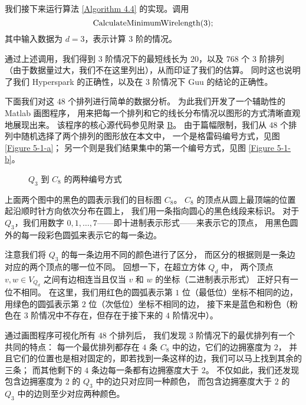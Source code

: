 我们接下来运行算法 \ref{Algorithm 4.4} 的实现。调用
\begin{equation*}
\textnormal{CalculateMinimumWirelength}(3);
\end{equation*}
其中输入数据为 $d = 3$，表示计算 $3$ 阶的情况。

通过上述调用，我们得到 $3$ 阶情况下的最短线长为 $20$，以及 $768$ 个 $3$ 阶排列
（由于数据量过大，我们不在这里列出），从而印证了我们的估算。
同时这也说明了我们 Hyperspark 的正确性，以及在 $3$ 阶情况下 Guu 的结论的正确性。

下面我们对这 $48$ 个排列进行简单的数据分析。
为此我们开发了一个辅助性的 Matlab 画图程序，
用来把每一个排列和它的线长分布情况以图形的方式清晰直观地展现出来。
该程序的核心源代码参见附录 \hyperref[Appendix B]{B}。
由于篇幅限制，我们从 $48$ 个排列中随机选择了两个排列的图形放在本文中，
一个是格雷码编号方式，见图 \ref{Figure 5-1-a}；
另一个则是我们结果集中的第一个编号方式，见图 \ref{Figure 5-1-b}。

\begin{figure}[h!]
	\centering
	\subfloat[格雷码编号方式]{
		
		\label{Figure 5-1-a}
	}
	\subfloat[另一种最优编号方式]{
		
		\label{Figure 5-1-b}
	}
	\caption{$Q_3$ 到 $C_{8}$ 的两种编号方式}
	\label{Figure 5-1}
\end{figure}

上面两个图中的黑色的圆表示我们的目标图 $C_8$。
$C_8$ 的顶点从圆上最顶端的位置起沿顺时针方向依次分布在圆上，
我们用一条指向圆心的黑色线段来标识。
对于 $Q_3$，我们用数字 $0, 1, \dots, 7$——即十进制表示形式——来表示它的顶点，
用黑色圆外的每一段彩色圆弧来表示它的每一条边。

注意我们将 $Q_3$ 的每一条边用不同的颜色进行了区分，
而区分的根据则是一条边对应的两个顶点的哪一位不同。
回想一下，在超立方体 $Q_d$ 中，
两个顶点 $v, w \in V_{Q_d}$ 之间有边相连当且仅当 $v$ 和 $w$ 的坐标（二进制表示形式）
正好只有一位不相同。
在这里，我们用红色的圆弧表示第 $1$ 位（最低位）坐标不相同的边，
用绿色的圆弧表示第 $2$ 位（次低位）坐标不相同的边，
接下来是蓝色和粉色（粉色在 $3$ 阶情况中不存在，但存在于接下来的 $4$ 阶情况中）。

通过画图程序可视化所有 $48$ 个排列后，
我们发现 $3$ 阶情况下的最优排列有一个共同的特点：
每一个最优排列都存在 $4$ 条 $C_8$ 中的边，它们的边拥塞度为 $2$，
并且它们的位置也是相对固定的，即若找到一条这样的边，我们可以马上找到其余的三条；
而其他剩下的 $4$ 条边每一条都有边拥塞度大于 $2$。
不仅如此，我们还发现包含边拥塞度为 $2$ 的 $Q_3$ 中的边只对应同一种颜色，
而包含边拥塞度大于 $2$ 的 $Q_3$ 中的边则至少对应两种颜色。

